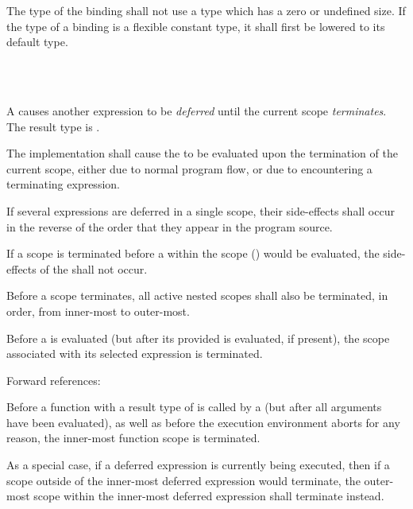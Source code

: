 \specsubsubitem
The type of the binding shall not use a type which has a zero or undefined size.
If the type of a binding is a flexible constant type, it shall first be lowered
to its default type.


\begin{grammar}
 \\
	  \\
\end{grammar}

\specsubsubitem
A  causes another expression to be
\textit{deferred} until the current scope \textit{terminates}. The result type
is .

\specsubsubitem
The implementation shall cause the  to be evaluated
upon the termination of the current scope, either due to normal program flow,
or due to encountering a terminating expression.

\specsubsubitem
If several expressions are deferred in a single scope, their side-effects shall
occur in the reverse of the order that they appear in the program source.

\specsubsubitem
If a scope is terminated before a  within the
scope () would be
evaluated, the side-effects of the  shall not occur.

\specsubsubitem
Before a scope terminates, all active nested scopes shall also be terminated, in
order, from inner-most to outer-most.

\specsubsubitem
Before a  is evaluated (but after its provided
 is evaluated, if present), the scope associated with
its selected expression is terminated.

Forward references: 

\specsubsubitem
Before a function with a result type of  is called by a
 (but after all arguments have been evaluated), as
well as before the execution environment aborts for any reason, the inner-most
function scope is terminated.

\specsubsubitem
As a special case, if a deferred expression is currently being executed, then if
a scope outside of the inner-most deferred expression would terminate, the
outer-most scope within the inner-most deferred expression shall terminate
instead.

